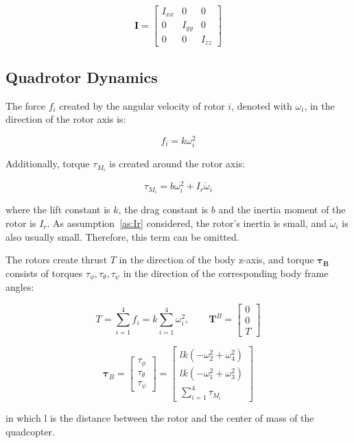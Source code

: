 \documentclass[letterpaper, 10 pt, conference]{ieeeconf}  %
\begin{document}
 $$\boldsymbol{I}=\left[ \begin{array}{ccc}{I_{x x}} & {0} & {0} \\ {0} & {I_{y y}} & {0} \\ {0} & {0} & {I_{z z}}\end{array}\right]$$
 
 \subsection{Quadrotor Dynamics}

The force $f_i$ created by the angular velocity of rotor $i$, denoted with $\omega_i$, in the direction of the rotor axis is:

$$f_{i}=k \omega_{i}^{2}$$

Additionally, torque $\tau_{M_i}$ is created around the rotor axis:

$$\tau_{M_{i}} = b \omega_{i}^{2} + I_{r} \dot{\omega}_{i} $$

where the lift constant is $k$, the drag constant is $b$ and the inertia moment of the rotor is $I_{r}$. As assumption~\ref{as:Ir} considered, the rotor's inertia is small, and $\dot{\omega}_{i}$ is also usually small. Therefore, this term can be omitted.

The rotors create thrust $T$ in the direction of the body z-axis, and torque $\bm{\tau_B}$ consists of torques $\tau_\phi, \tau_\theta, \tau_\psi$ in the direction of the corresponding body frame angles:

$$T=\sum_{i=1}^{4} f_{i}=k \sum_{i=1}^{4} \omega_{i}^{2}, \quad \quad \boldsymbol{T}^{B}=\left[ \begin{array}{c}{0} \\ {0} \\ {T}\end{array}\right]$$

$$
\boldsymbol{\tau}_{B}=\left[ \begin{array}{c}{\tau_{\phi}} \\ {\tau_{\theta}} \\ {\tau_{\psi}}\end{array}\right]=
\left[ \begin{array}{c}{l k\left(-\omega_{2}^{2}+\omega_{4}^{2}\right)} \\ {l k\left(-\omega_{1}^{2}+\omega_{3}^{2}\right)} \\ {\sum_{i=1}^{4} \tau_{M_{i}}}\end{array}\right]
$$

in which l is the distance between the rotor and the center of mass of the quadcopter.
\end{document}
